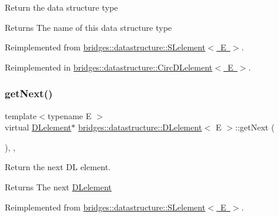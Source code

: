Return the data structure type

\begin{DoxyReturn}{Returns}
The name of this data structure type 
\end{DoxyReturn}


Reimplemented from \mbox{\hyperlink{classbridges_1_1datastructure_1_1_s_lelement_a602156aacacd73d1faa365d68d8af31b}{bridges\+::datastructure\+::\+S\+Lelement$<$ E $>$}}.



Reimplemented in \mbox{\hyperlink{classbridges_1_1datastructure_1_1_circ_d_lelement_aec7f9b9dc6626c1a872feb91cd65425d}{bridges\+::datastructure\+::\+Circ\+D\+Lelement$<$ E $>$}}.

\mbox{\label{classbridges_1_1datastructure_1_1_d_lelement_a63212051ea77d74bd751dea00288d2be}} 
\subsubsection{\texorpdfstring{get\+Next()}{getNext()}\hspace{0.1cm}{\footnotesize\ttfamily [1/2]}}
{\footnotesize\ttfamily template$<$typename E $>$ \\
virtual \mbox{\hyperlink{classbridges_1_1datastructure_1_1_d_lelement}{D\+Lelement}}$\ast$ \mbox{\hyperlink{classbridges_1_1datastructure_1_1_d_lelement}{bridges\+::datastructure\+::\+D\+Lelement}}$<$ E $>$\+::get\+Next (\begin{DoxyParamCaption}{ }\end{DoxyParamCaption})\hspace{0.3cm}{\ttfamily [inline]}, {\ttfamily [override]}, {\ttfamily [virtual]}}

Return the next DL element.

\begin{DoxyReturn}{Returns}
The next \mbox{\hyperlink{classbridges_1_1datastructure_1_1_d_lelement}{D\+Lelement}} 
\end{DoxyReturn}


Reimplemented from \mbox{\hyperlink{classbridges_1_1datastructure_1_1_s_lelement_ae43dd771d9ced7cb17f1d35f34cd9a42}{bridges\+::datastructure\+::\+S\+Lelement$<$ E $>$}}.



